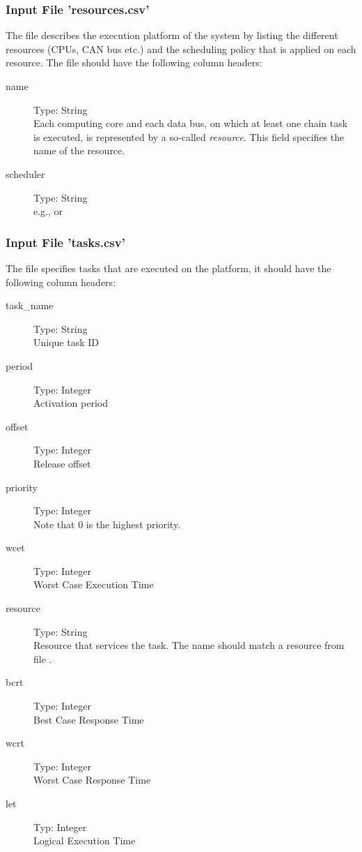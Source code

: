 \subsubsection{Input File 'resources.csv'}
\label{sec:input-files-resources}
The  file describes the execution platform of the system by listing the different resources (CPUs, CAN bus etc.) and the scheduling policy that is applied on each resource. 
The  file should have the following column headers:
\begin{description}
		\item [name] Type: String \hfill \\ 
		Each computing core and each data bus, on which at least one chain task is executed, is represented by a so-called \emph{resource}.   This field specifies the name of the resource.		
		\item [scheduler] Type: String \hfill \\ 
		e.g.,  or 
\end{description}
\bigskip


\subsubsection{Input File 'tasks.csv'}
\label{sec:input-files-tasks}
The  file specifies tasks that are executed on the platform, it should have the following column headers:
\begin{description}
		\item [task\_name] Type: String \hfill \\ 
		Unique task ID
		\item [period] Type: Integer \hfill \\ 
		Activation period		
		\item [offset] Type: Integer \hfill \\ 
		Release offset
		\item [priority] Type: Integer \hfill \\ 
		Note that 0 is the highest priority.
		\item [wcet] Type: Integer \hfill \\ 
		Worst Case Execution Time		
		\item [resource] Type: String \hfill \\ 
		Resource that services the task. 
		The name should match a resource from file .
		\item [bcrt] Type: Integer \hfill \\ 
		Best Case Response Time		
		\item [wcrt] Type: Integer \hfill \\ 
		Worst Case Response Time
		\item [let] Typ: Integer \hfill \\ 
		Logical Execution Time 
\end{description}
\bigskip


